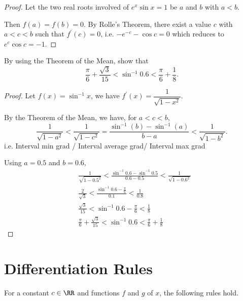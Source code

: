 \begin{proof}
Let the two real roots involved of $e^x\sin x=1$ be $a$ and $b$ with $a<b$.

Then $f(a)=f(b)=0$. By Rolle's Theorem, there exist a value $c$ with $a<c<b$ such that $f^\prime(c)=0$, i.e. $-e^{-c}-\cos c=0$ which reduces to $e^c\cos c=-1$.
\end{proof}

\begin{exercise}
By using the Theorem of the Mean, show that
\[ \frac{\pi}{6}+\frac{\sqrt{3}}{15}<\sin^{-1}0.6<\frac{\pi}{6}+\frac{1}{8}. \]
\end{exercise}

\begin{proof}
Let $f(x)=\sin^{-1}x$, we have $f^\prime(x)=\dfrac{1}{\sqrt{1-x^2}}$.

By the Theorem of the Mean, we have, for $a<c<b$,
\[ \frac{1}{\sqrt{1-a^2}}<\frac{1}{\sqrt{1-c^2}}=\frac{\sin^{-1}(b)-\sin^{-1}(a)}{b-a}<\frac{1}{\sqrt{1-b^2}}. \]
i.e. Interval min grad / Interval average grad/ Interval max grad

Using $a=0.5$ and $b=0.6$,
\begin{align*}
&\frac{1}{\sqrt{1-0.5^2}}<\frac{\sin^{-1}0.6-\sin^{-1}0.5}{0.6-0.5}<\frac{1}{\sqrt{1-0.6^2}} \\
&\frac{2}{\sqrt{3}}<\frac{\sin^{-1}0.6-\frac{\pi}{6}}{0.1}<\frac{1}{0.8} \\
&\frac{\sqrt{3}}{15}<\sin^{-1}0.6-\frac{\pi}{6}<\frac{1}{8} \\
&\frac{\pi}{6}+\frac{\sqrt{3}}{15}<\sin^{-1}0.6<\frac{\pi}{6}+\frac{1}{8}
\end{align*}
\end{proof}
\pagebreak

\section{Differentiation Rules}
For a constant $c\in\RR$ and functions $f$ and $g$ of $x$, the following rules hold.

